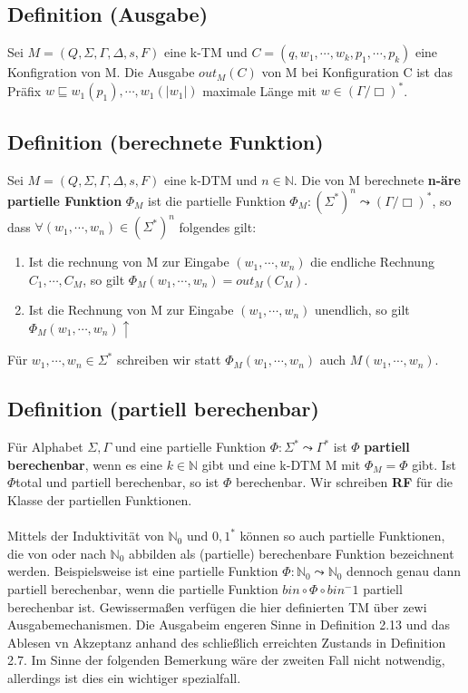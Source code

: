 \subsection{Definition (Ausgabe)} Sei $M = (Q, \Sigma, \Gamma, \Delta, s, F)$ eine k-TM und $C = (q, w_1, \cdots, w_k, p_1, \cdots, p_k)$ eine Konfigration von M. Die Ausgabe $out_M(C)$ von M bei Konfiguration C ist das Präfix $w \sqsubseteq w_1(p_1), \cdots, w_1(|w_1|)$ maximale Länge mit $w \in (\Gamma / {\Box})^*$.

\subsection{Definition (berechnete Funktion)} Sei $M = (Q, \Sigma, \Gamma, \Delta, s, F)$ eine k-DTM und $n \in \mathbb{N}$. Die von M berechnete \textbf{n-äre partielle Funktion} $\Phi_M$ ist die partielle Funktion $\Phi_M : (\Sigma^*)^n \leadsto (\Gamma / {\Box})^*$, so dass $\forall (w_1, \cdots, w_n) \in (\Sigma^*)^n$ folgendes gilt:
\begin{enumerate}
  \item Ist die rechnung von M zur Eingabe $(w_1, \cdots, w_n)$ die endliche Rechnung $C_1, \cdots, C_M$, so gilt $\Phi_M(w_1, \cdots, w_n) = out_M(C_M)$.
  \item Ist die Rechnung von M zur Eingabe $(w_1, \cdots, w_n)$ unendlich, so gilt $\Phi_M(w_1, \cdots, w_n)\uparrow $
\end{enumerate}
Für $w_1, \cdots, w_n \in \Sigma^*$ schreiben wir statt $\Phi_M(w_1, \cdots, w_n)$ auch $M(w_1, \cdots, w_n)$.

\subsection{Definition (partiell berechenbar)}
Für Alphabet $\Sigma, \Gamma$ und eine partielle Funktion $\Phi : \Sigma^* \leadsto \Gamma^*$ ist $\Phi$ \textbf{partiell berechenbar}, wenn es eine $k \in \mathbb{N}$ gibt und eine k-DTM M mit $\Phi_M = \Phi$ gibt. Ist $\Phi $total und partiell berechenbar, so ist $\Phi$ berechenbar. Wir schreiben \textbf{RF} für die Klasse der partiellen Funktionen.\\\\Mittels der Induktivität von $\mathbb{N}_0$ und ${0, 1}^*$ können so auch partielle Funktionen, die von oder nach $\mathbb{N}_0$ abbilden als (partielle) berechenbare Funktion bezeichnent werden. Beispielsweise ist eine partielle Funktion $\Phi : \mathbb{N}_0 \leadsto \mathbb{N}_0$ dennoch genau dann partiell berechenbar, wenn die partielle Funktion $bin \circ \Phi \circ bin^-1$ partiell berechenbar ist. Gewissermaßen verfügen die hier definierten TM über zewi Ausgabemechanismen. Die Ausgabeim engeren Sinne in Definition 2.13 und das Ablesen vn Akzeptanz anhand des schließlich erreichten Zustands in Definition 2.7. Im Sinne der folgenden Bemerkung wäre der zweiten Fall nicht notwendig, allerdings ist dies ein wichtiger spezialfall.

